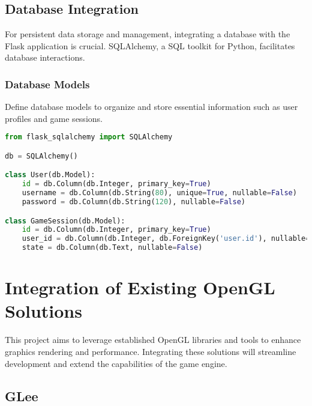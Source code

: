 \subsection*{Database Integration}

For persistent data storage and management, integrating a database with the Flask application is crucial. SQLAlchemy, a SQL toolkit for Python, facilitates database interactions.

\subsubsection*{Database Models}

Define database models to organize and store essential information such as user profiles and game sessions.

\begin{lstlisting}[caption={SQLAlchemy Database Models}, language=Python]
from flask_sqlalchemy import SQLAlchemy

db = SQLAlchemy()

class User(db.Model):
    id = db.Column(db.Integer, primary_key=True)
    username = db.Column(db.String(80), unique=True, nullable=False)
    password = db.Column(db.String(120), nullable=False)

class GameSession(db.Model):
    id = db.Column(db.Integer, primary_key=True)
    user_id = db.Column(db.Integer, db.ForeignKey('user.id'), nullable=False)
    state = db.Column(db.Text, nullable=False)
\end{lstlisting}









\pagebreak



\section*{Integration of Existing OpenGL Solutions}

This project aims to leverage established OpenGL libraries and tools to enhance graphics rendering and performance. Integrating these solutions will streamline development and extend the capabilities of the game engine.

\subsection*{GLee}

